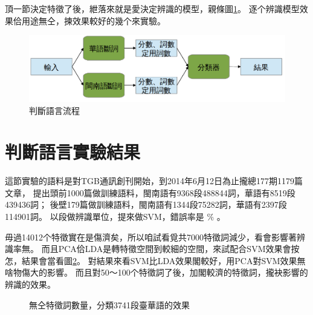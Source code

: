 \documentclass[final,oneside,onecolumn,12pt,a4paper]{book}%
\begin{document}
頂一節決定特徵了後，紲落來就是愛決定辨識的模型，親條圖\ref{圖：判斷語言架構}。
逐个辨識模型效果佮用途無仝，揀效果較好的幾个來實驗。

\begin{figure}
\centerline{\includegraphics[keepaspectratio]{圖/判斷語言架構}}
\caption{判斷語言流程}
\label{圖：判斷語言架構}
\end{figure}


\section{判斷語言實驗結果}
\label{節：判斷語言實驗結果}
這節實驗的語料是對TGB通訊創刊開始，到2014年6月12日為止攏總177期1179篇文章，
提出頭前1000篇做訓練語料，閩南語有9368段488844詞，華語有8519段439436詞；
後壁179篇做訓練語料，閩南語有1344段75282詞，華語有2397段114901詞。
以段做辨識單位，提來做SVM，錯誤率是 $\%$ 。

毋過14012个特徵實在是傷濟矣，所以咱試看覓共7000特徵詞減少，看會影響著辨識率無。
而且PCA佮LDA是轉特徵空間到較細的空間，來試配合SVM效果會按怎，結果會當看圖\ref{圖：無仝分類模型佮特徵詞數量對分類臺華語效果的影響}。
對結果來看SVM比LDA效果閣較好，用PCA對SVM效果無啥物傷大的影響。
而且對50～100个特徵詞了後，加閣較濟的特徵詞，攏袂影響的辨識的效果。

\begin{figure}
\caption{無仝特徵詞數量，分類3741段臺華語的效果}
\label{圖：無仝分類模型佮特徵詞數量對分類臺華語效果的影響}
\end{figure}
\end{document}
